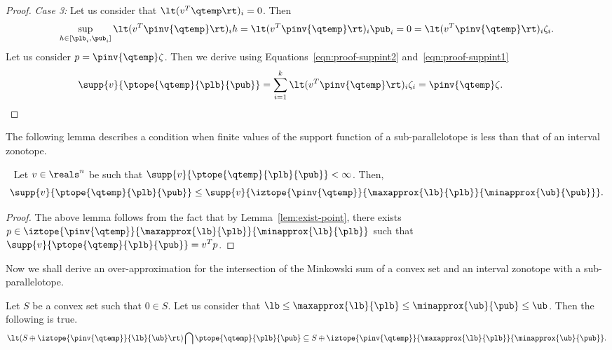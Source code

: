 \begin{proof}
{\it Case 3:  }  Let us consider that $\lt(v^T\qtemp\rt)_i=0$.  Then
%
\[
\sup_{h\in[\plb_i,\pub_i]}\lt(v^T\pinv{\qtemp}\rt)_ih=\lt(v^T\pinv{\qtemp}\rt)_i\pub_i
= 0 = \lt(v^T\pinv{\qtemp}\rt)_i\zeta_i.
\]
%
Let us consider $p=\pinv{\qtemp}\zeta$.  Then we derive using
Equations~\ref{eqn:proof-suppint2} and~\ref{eqn:proof-suppint1}
%
\begin{align*}
\supp{v}{\ptope{\qtemp}{\plb}{\pub}} = \sum_{i=1}^k\lt(v^T\pinv{\qtemp}\rt)_i\zeta_i=\pinv{\qtemp}\zeta.~\hspace{3em}\qedhere
\end{align*}
%
\end{proof}
%

The following lemma describes a condition when finite values of the
support function of a sub-parallelotope is less than that of an
interval zonotope.
%
\begin{lemma}~\label{lem:min-support}
Let $v\in\reals^n$ be such that
$\supp{v}{\ptope{\qtemp}{\plb}{\pub}}<\infty$.  Then,
%
\[
\supp{v}{\ptope{\qtemp}{\plb}{\pub}}\leq\supp{v}{\iztope{\pinv{\qtemp}}{\maxapprox{\lb}{\plb}}{\minapprox{\ub}{\pub}}}.
\]
%
\end{lemma}
%
\begin{proof}
The above lemma follows from the fact that by
Lemma~\ref{lem:exist-point}, there exists
$p\in\iztope{\pinv{\qtemp}}{\maxapprox{\lb}{\plb}}{\minapprox{\lb}{\plb}}$
such that $\supp{v}{\ptope{\qtemp}{\plb}{\pub}}=v^Tp$.  
\end{proof}
%
Now we shall derive an over-approximation for the intersection of the
Minkowski sum of a convex set and an interval zonotope with a
sub-parallelotope.
%
\begin{lemma}
Let $S$ be a convex set such that $0\in S$.  Let us consider that
${\lb\leq\maxapprox{\lb}{\plb}\leq\minapprox{\ub}{\pub}\leq\ub}$.  Then the following is
true.
%
\[
\lt(S\oplus\iztope{\pinv{\qtemp}}{\lb}{\ub}\rt)\bigcap\ptope{\qtemp}{\plb}{\pub}\subseteq
S\oplus\iztope{\pinv{\qtemp}}{\maxapprox{\lb}{\plb}}{\minapprox{\ub}{\pub}}. 
\]
%
\end{lemma}
%
